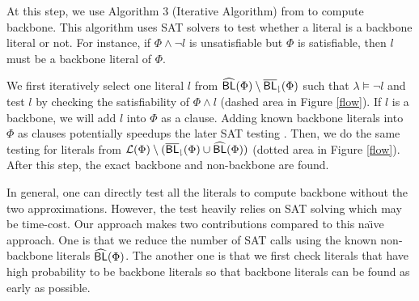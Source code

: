 \medskip
{}
At this step, we use Algorithm 3 (Iterative Algorithm) from \cite{JLM15} to compute backbone.
This algorithm uses SAT solvers to test whether a literal is a backbone literal or not.
For instance, if $\Phi\wedge \neg l$ is unsatisfiable but $\Phi$ is satisfiable, then $l$ must be a backbone literal of $\Phi$.

We first iteratively select one literal $l$ from ${\sf \widehat{BL}}(\Phi)\setminus {\sf \overline{BL}_\downharpoonright}(\Phi)$ such that $\lambda \models \neg l$ and test $l$ by checking the satisfiability of $\Phi\wedge l$ (dashed area in Figure \ref{flow}).
If $l$ is a backbone, we will add $l$ into $\Phi$ as a clause. Adding known backbone literals into $\Phi$ as clauses potentially speedups the later SAT testing \cite{JLM15,MPA2015}.
Then, we do the same testing for literals from $\Lit(\Phi)\setminus (\NBLap(\Phi)\cup\BLap(\Phi))$ (dotted area in Figure \ref{flow}).
After this step, the exact backbone and non-backbone are found.


In general, one can directly test all the literals to compute backbone without the two approximations.
However, the test heavily relies on SAT solving which may be time-cost.
Our approach makes two contributions compared to this na\"{\i}ve approach.
One is that we reduce the number of SAT calls using the known non-backbone literals ${\sf \widehat{BL}}(\Phi)$.
The another one is that we first check literals that have high probability to be backbone literals so that backbone literals can be found as early as possible.



